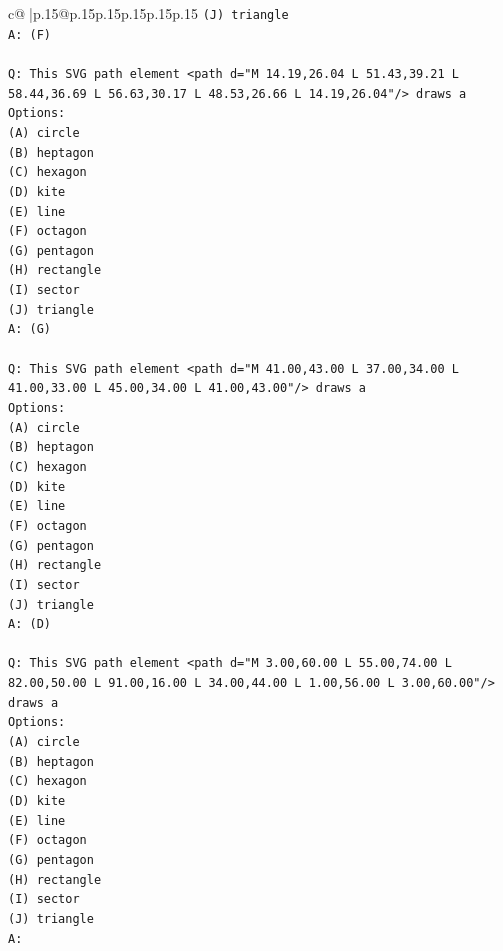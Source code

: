 \documentclass{article}
\begin{document}
{\begin{supertabular}{c@{$\;$}|p{.15\linewidth}@{}p{.15\linewidth}p{.15\linewidth}p{.15\linewidth}p{.15\linewidth}p{.15\linewidth}}
{{{\texttt{(J) triangle} \\
\texttt{A: (F)} \\
\\ 
\texttt{Q: This SVG path element <path d="M 14.19,26.04 L 51.43,39.21 L 58.44,36.69 L 56.63,30.17 L 48.53,26.66 L 14.19,26.04"/> draws a} \\
\texttt{Options:} \\
\texttt{(A) circle} \\
\texttt{(B) heptagon} \\
\texttt{(C) hexagon} \\
\texttt{(D) kite} \\
\texttt{(E) line} \\
\texttt{(F) octagon} \\
\texttt{(G) pentagon} \\
\texttt{(H) rectangle} \\
\texttt{(I) sector} \\
\texttt{(J) triangle} \\
\texttt{A: (G)} \\
\\ 
\texttt{Q: This SVG path element <path d="M 41.00,43.00 L 37.00,34.00 L 41.00,33.00 L 45.00,34.00 L 41.00,43.00"/> draws a} \\
\texttt{Options:} \\
\texttt{(A) circle} \\
\texttt{(B) heptagon} \\
\texttt{(C) hexagon} \\
\texttt{(D) kite} \\
\texttt{(E) line} \\
\texttt{(F) octagon} \\
\texttt{(G) pentagon} \\
\texttt{(H) rectangle} \\
\texttt{(I) sector} \\
\texttt{(J) triangle} \\
\texttt{A: (D)} \\
\\ 
\texttt{Q: This SVG path element <path d="M 3.00,60.00 L 55.00,74.00 L 82.00,50.00 L 91.00,16.00 L 34.00,44.00 L 1.00,56.00 L 3.00,60.00"/> draws a} \\
\texttt{Options:} \\
\texttt{(A) circle} \\
\texttt{(B) heptagon} \\
\texttt{(C) hexagon} \\
\texttt{(D) kite} \\
\texttt{(E) line} \\
\texttt{(F) octagon} \\
\texttt{(G) pentagon} \\
\texttt{(H) rectangle} \\
\texttt{(I) sector} \\
\texttt{(J) triangle} \\
\texttt{A:} \\
            }
        }
    }
     \\ \\


\end{supertabular}}
\end{document}
